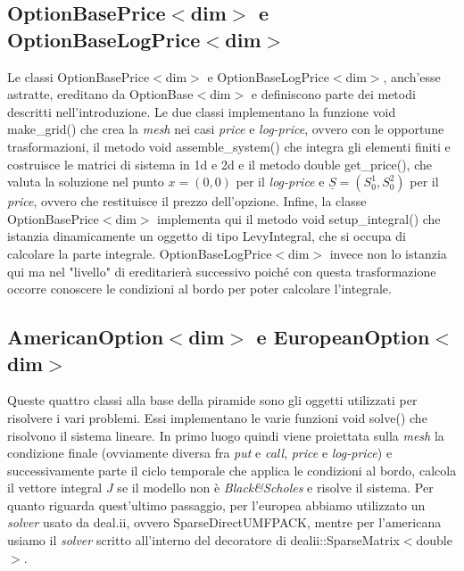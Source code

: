 \documentclass[a4paper,10pt]{report}
\theoremstyle{plain}
\theoremstyle{definition}
\theoremstyle{remark}
\begin{document}
\subsection{\textsf{OptionBasePrice$<$dim$>$} e \textsf{OptionBaseLogPrice$<$dim$>$}}
Le classi \textsf{OptionBasePrice$<$dim$>$} e \textsf{OptionBaseLogPrice$<$dim$>$}, anch'esse astratte, ereditano da \textsf{OptionBase$<$dim$>$} e definiscono parte dei metodi descritti nell'introduzione. Le due classi implementano la funzione \textsf{void make\_grid()} che crea la \emph{mesh} nei casi \emph{price} e \emph{log-price}, ovvero con le opportune trasformazioni, il metodo \textsf{void assemble\_system()} che integra gli elementi finiti e costruisce le matrici di sistema in 1d e 2d e il metodo \textsf{double get\_price()}, che valuta la soluzione nel punto $x=(0,0)$ per il \emph{log-price} e $\underline{S}=(S_0^1, S_0^2)$ per il \emph{price}, ovvero che restituisce il prezzo dell'opzione. Infine, la classe \textsf{OptionBasePrice$<$dim$>$} implementa qui il metodo \textsf{void setup\_integral()} che istanzia dinamicamente un oggetto di tipo \textsf{LevyIntegral}, che si occupa di calcolare la parte integrale. \textsf{OptionBaseLogPrice$<$dim$>$} invece non lo istanzia qui ma nel "livello" di ereditarier\`a successivo poich\'e con questa trasformazione occorre conoscere le condizioni al bordo per poter calcolare l'integrale.
\subsection{\textsf{AmericanOption$<$dim$>$} e \textsf{EuropeanOption$<$dim$>$}}
Queste quattro classi alla base della piramide sono gli oggetti utilizzati per risolvere i vari problemi. Essi implementano le varie funzioni \textsf{void solve()} che risolvono il sistema lineare. In primo luogo quindi viene proiettata sulla \emph{mesh} la condizione finale (ovviamente diversa fra \emph{put} e \emph{call}, \emph{price} e \emph{log-price}) e successivamente parte il ciclo temporale che applica le condizioni al bordo, calcola il vettore integral $J$ se il modello non \`e \emph{Black\&Scholes} e risolve il sistema. Per quanto riguarda quest'ultimo passaggio, per l'europea abbiamo utilizzato un \emph{solver} usato da \textsf{deal.ii}, ovvero \textsf{SparseDirectUMFPACK}, mentre per l'americana usiamo il \emph{solver} scritto all'interno del decoratore di \textsf{dealii::SparseMatrix$<$double$>$}.

\end{document}
